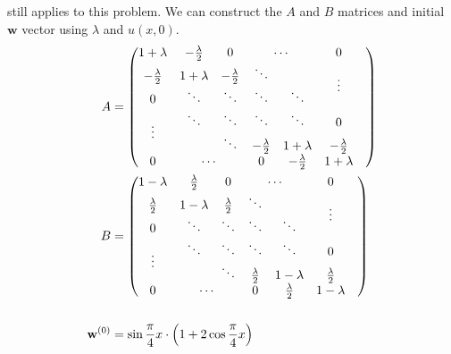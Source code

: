 \documentclass[12pt]{article}
\begin{document}
 still applies to this problem. We can construct the
$A$ and $B$ matrices and initial $\mathbf{w}$ vector using $\lambda$ and $u(x,0)$.
\begin{equation}
  \label{eq:10b_A}
  \begin{aligned}
    A &=
    \begin{pmatrix}
      1+\lambda & -\frac{\lambda}{2} & 0 & \multicolumn{2}{c}{\cdots} & 0 \\
      -\frac{\lambda}{2} & 1+\lambda & -\frac{\lambda}{2} & \ddots &  & \multirow{2}{*}{\vdots} \\
      0 & \ddots & \ddots & \ddots & \ddots & & \\
      \multirow{2}{*}{\vdots} & \ddots & \ddots & \ddots & \ddots & 0 \\
      & & \ddots & -\frac{\lambda}{2} & 1+\lambda & -\frac{\lambda}{2} \\
      0 & \multicolumn{2}{c}{\cdots} & 0 & -\frac{\lambda}{2} & 1+\lambda \\
    \end{pmatrix} \\
    B &=
    \begin{pmatrix}
      1-\lambda & \frac{\lambda}{2} & 0 & \multicolumn{2}{c}{\cdots} & 0 \\
      \frac{\lambda}{2} & 1-\lambda & \frac{\lambda}{2} & \ddots &  & \multirow{2}{*}{\vdots} \\
      0 & \ddots & \ddots & \ddots & \ddots & & \\
      \multirow{2}{*}{\vdots} & \ddots & \ddots & \ddots & \ddots & 0 \\
      & & \ddots & \frac{\lambda}{2} & 1-\lambda & \frac{\lambda}{2} \\
      0 & \multicolumn{2}{c}{\cdots} & 0 & \frac{\lambda}{2} & 1-\lambda \\
    \end{pmatrix} \\
    \\
    \mathbf{w}^{(0)} &= \sin\frac{\pi}{4}x \cdot
    \left(1+2\cos\frac{\pi}{4}x\right)\\
  \end{aligned}
\end{equation}
\end{document}
